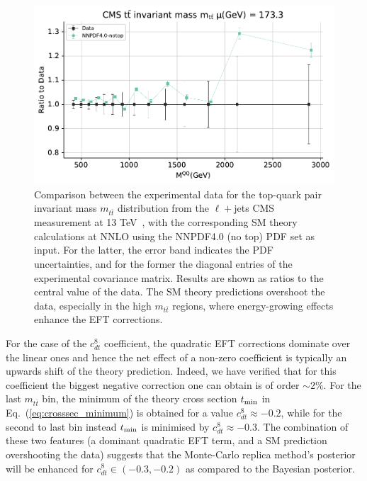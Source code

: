 \documentclass[withindex,glossary]{cam-thesis}
\begin{document}
\begin{figure}[t]
        \centering
        \includegraphics[width=0.82\linewidth]{data_theory_plots/CMS_TTBAR_13TEV_TTMNORM_NNPDF40-notop.pdf}
        \caption{Comparison between the experimental data
          for the top-quark pair invariant mass $m_{t\bar{t}}$ distribution
          from the $\ell+$jets CMS measurement at 13 TeV~\cite{CMS:2021vhb}, with the corresponding
          SM theory calculations at NNLO using the NNPDF4.0 (no top) PDF
          set as input.
          For the latter, the error band indicates the PDF uncertainties, and
          for the former the diagonal entries of the experimental covariance matrix.
          Results are shown as ratios to the central value of the data.
          The SM theory predictions overshoot the data, especially in the high $m_{t\bar{t}}$
          regions, where energy-growing effects enhance the EFT corrections.
        }
    \label{fig:data-theory-CMS}
\end{figure}

For the case of the $c_{dt}^8$ coefficient, the quadratic EFT corrections dominate over the linear ones
and hence the net effect of a non-zero coefficient is typically an upwards shift
of the theory prediction.
%
Indeed, we have verified that for this coefficient
the biggest negative correction one can obtain is of order $\sim 2\%$.
%
For the last $m_{t\bar{t}}$ bin, the minimum of the  theory cross
section $t_{\rm min}$ in Eq.~(\ref{eq:crosssec_minimum}) is obtained for a value
$c_{dt}^8 \approx -0.2$, while for the second to last bin instead $t_{\rm min}$
is minimised by $c_{dt}^8 \approx -0.3$.
%
The combination of these two features (a dominant quadratic EFT term, and a SM prediction overshooting
the data) suggests that the Monte-Carlo replica method's
posterior will be enhanced for $c_{dt}^8 \in (-0.3,-0.2)$ as compared
to the Bayesian posterior.
\end{document}
